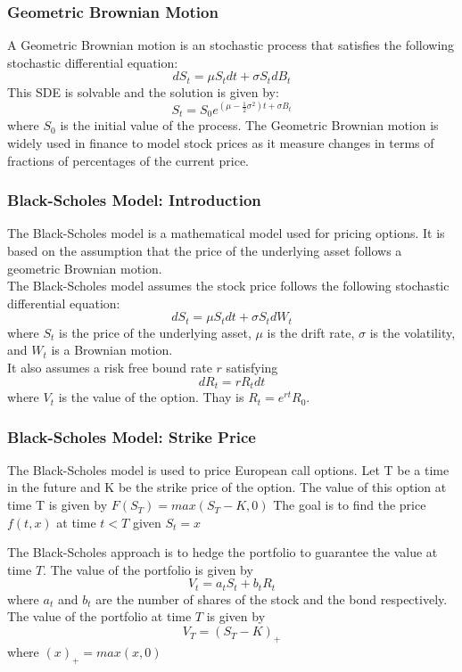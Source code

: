 \documentclass{beamer}
\begin{document}
\begin{frame}
    \frametitle{Geometric Brownian Motion}
    A Geometric Brownian motion is an stochastic process that satisfies the following stochastic differential equation:
    $$dS_t = \mu S_t dt + \sigma S_t dB_t$$
    This SDE is solvable and the solution is given by:
    $$S_t = S_0 e^{(\mu - \frac{1}{2}\sigma^2)t + \sigma B_t}$$
    where $S_0$ is the initial value of the process.
    The Geometric Brownian motion is widely used in finance to model stock prices as it measure changes in terms of fractions of percentages of the current price.
\end{frame}


\begin{frame}
    \frametitle{Black-Scholes Model: Introduction}
    The Black-Scholes model is a mathematical model used for pricing options. It is based on the assumption that the price of the underlying asset follows a geometric Brownian motion.\\
    \vspace{0.5cm}
    The Black-Scholes model assumes the stock price follows the following stochastic differential equation:
    $$dS_t = \mu S_t dt + \sigma S_t dW_t$$
    where $S_t$ is the price of the underlying asset, $\mu$ is the drift rate, $\sigma$ is the volatility, and $W_t$ is a Brownian motion.\\
    It also assumes a risk free bound rate $r$ satisfying
    $$dR_t = rR_t dt$$
    where $V_t$ is the value of the option. Thay is $R_t = e^{rt}R_0$.
\end{frame}

\begin{frame}
    \frametitle{Black-Scholes Model: Strike Price}
    The Black-Scholes model is used to price European call options. Let T be a time in the future and K be the strike price of the option. The value of this option at time T is given by 
    $F(S_T) = max(S_T - K, 0)$ 
    The goal is to find the price $f(t,x)$ at time $t<T$ given $S_t = x$ 

    The Black-Scholes approach is to hedge the portfolio to guarantee the value at time $T$. The value of the portfolio is given by
    $$ V_t = a_t S_t + b_t R_t$$
    where $a_t$ and $b_t$ are the number of shares of the stock and the bond respectively. The value of the portfolio at time $T$ is given by
    $$V_T = (S_T - K)_+$$
    where $(x)_+ = max(x,0)$
\end{frame}
\end{document}
